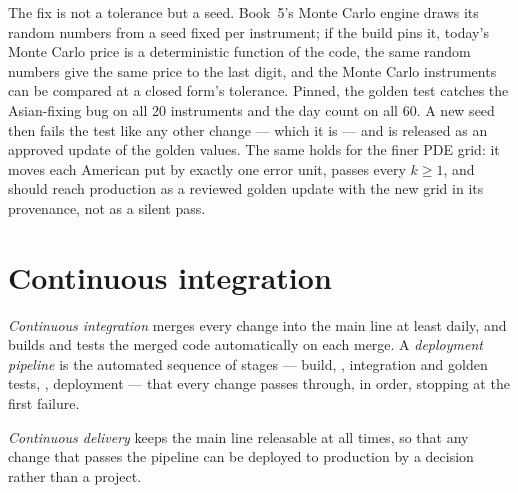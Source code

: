 The fix is not a tolerance but a seed. Book~5's Monte Carlo engine draws its random numbers from a seed fixed per instrument; if the build
pins it, today's Monte Carlo price is a deterministic function of the code, the same random numbers give the same price to the last digit,
and the Monte Carlo instruments can be compared at a closed form's tolerance. Pinned, the golden test catches the Asian-fixing bug on all 20
instruments and the day count on all 60. A new seed then fails the test like any other change --- which it is --- and is released as an
approved update of the golden values. The same holds for the finer PDE grid: it moves each American put by exactly one error unit, passes
every $k\ge1$, and should reach production as a reviewed golden update with the new grid in its provenance, not as a silent pass.

\section{Continuous integration}

\begin{definition}\label{def:pl:testing-and-continuous-delivery:ci}
\emph{Continuous integration} merges every change into the main line at least daily, and builds and tests the
merged code automatically on each merge. A \emph{deployment pipeline} is the automated sequence of stages ---
build, , integration and golden tests, , deployment --- that every change passes through, in order, stopping at the
first failure.
\end{definition}

\begin{definition}\label{def:pl:testing-and-continuous-delivery:cd}
\emph{Continuous delivery} keeps the main line releasable at all times, so that any change that passes the
pipeline can be deployed to production by a decision rather than a project.
\end{definition}

